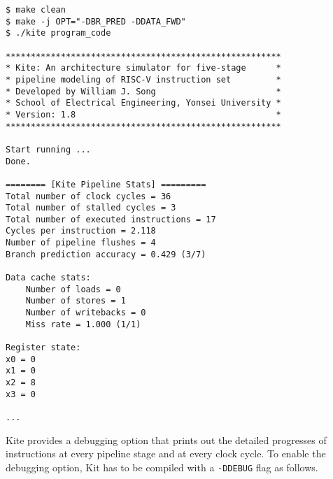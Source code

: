 \documentclass[10pt]{article}
\begin{document}
\begin{Verbatim}[frame=single,fontsize=\small]
$ make clean
$ make -j OPT="-DBR_PRED -DDATA_FWD"
$ ./kite program_code

*******************************************************
* Kite: An architecture simulator for five-stage      *
* pipeline modeling of RISC-V instruction set         *
* Developed by William J. Song                        *
* School of Electrical Engineering, Yonsei University *
* Version: 1.8                                        *
*******************************************************

Start running ...
Done.

======== [Kite Pipeline Stats] =========
Total number of clock cycles = 36
Total number of stalled cycles = 3
Total number of executed instructions = 17
Cycles per instruction = 2.118
Number of pipeline flushes = 4
Branch prediction accuracy = 0.429 (3/7)

Data cache stats:
    Number of loads = 0
    Number of stores = 1
    Number of writebacks = 0
    Miss rate = 1.000 (1/1)

Register state:
x0 = 0
x1 = 0
x2 = 8
x3 = 0

...

\end{Verbatim}

Kite provides a debugging option that prints out the detailed progresses of instructions at every pipeline stage and at every clock cycle.
To enable the debugging option, Kit has to be compiled with a {\tt -DDEBUG} flag as follows.
\end{document}
